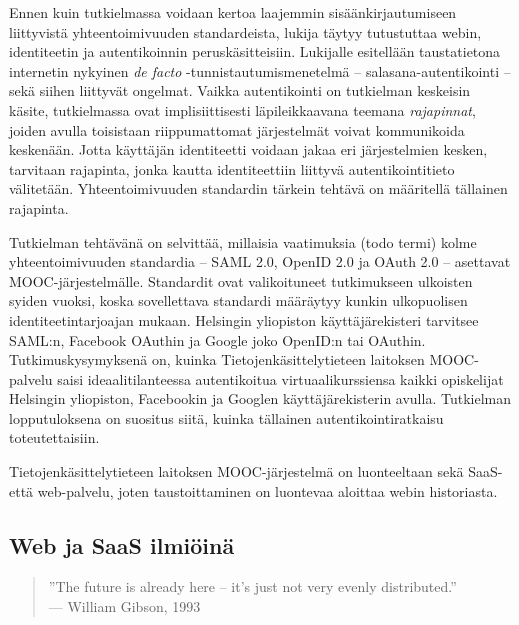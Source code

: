 \documentclass[finnish,gradu]{tktltiki}
\begin{document}
Ennen kuin tutkielmassa voidaan kertoa laajemmin sisäänkirjautumiseen liittyvistä yhteentoimivuuden standardeista, lukija täytyy tutustuttaa webin, identiteetin ja autentikoinnin peruskäsitteisiin. Lukijalle esitellään taustatietona internetin nykyinen \emph{de facto} -tunnistautumismenetelmä -- salasana-autentikointi -- sekä siihen liittyvät ongelmat. Vaikka autentikointi on tutkielman keskeisin käsite, tutkielmassa ovat implisiittisesti läpileikkaavana teemana \emph{rajapinnat}, joiden avulla toisistaan riippumattomat järjestelmät voivat kommunikoida keskenään. Jotta käyttäjän identiteetti voidaan jakaa eri järjestelmien kesken, tarvitaan rajapinta, jonka kautta identiteettiin liittyvä autentikointitieto välitetään. Yhteentoimivuuden standardin tärkein tehtävä on määritellä tällainen rajapinta.

Tutkielman tehtävänä on selvittää, millaisia vaatimuksia (todo termi) kolme yhteentoimivuuden standardia -- SAML 2.0, OpenID 2.0 ja OAuth 2.0 -- asettavat MOOC-järjestelmälle. Standardit ovat valikoituneet tutkimukseen ulkoisten syiden vuoksi, koska sovellettava standardi määräytyy kunkin ulkopuolisen identiteetintarjoajan mukaan. Helsingin yliopiston käyttäjärekisteri tarvitsee SAML:n, Facebook OAuthin ja Google joko OpenID:n tai OAuthin. Tutkimuskysymyksenä on, kuinka Tietojenkäsittelytieteen laitoksen MOOC-palvelu saisi ideaalitilanteessa autentikoitua virtuaalikurssiensa kaikki opiskelijat Helsingin yliopiston, Facebookin ja Googlen käyttäjärekisterin avulla. Tutkielman lopputuloksena on suositus siitä, kuinka tällainen autentikointiratkaisu toteutettaisiin.

Tietojenkäsittelytieteen laitoksen MOOC-järjestelmä on luonteeltaan sekä SaaS- että web-palvelu, joten taustoittaminen on luontevaa aloittaa webin historiasta.


\subsection{Web ja SaaS ilmiöinä} %

\label{sub:web_ja_saas}

  \begin{quote}
    ''The future is already here -- it's just not very evenly distributed.''
    \\ --- William Gibson, 1993
  \end{quote}
\end{document}

